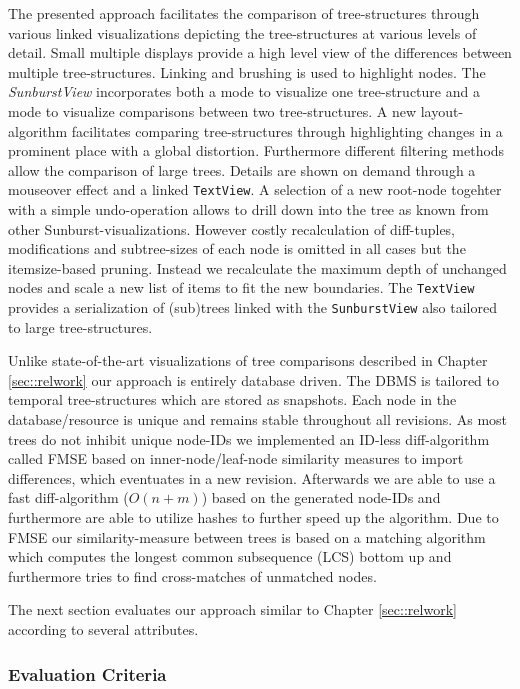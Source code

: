 The presented approach facilitates the comparison of tree-structures through various linked visualizations depicting the tree-structures at various levels of detail. Small multiple displays provide a high level view of the differences between multiple tree-structures. Linking and brushing is used to highlight nodes. The \emph{SunburstView} incorporates both a mode to visualize one tree-structure and a mode to visualize comparisons between two tree-structures. A new layout-algorithm facilitates comparing tree-structures through highlighting changes in a prominent place with a global distortion. Furthermore different filtering methods allow the comparison of large trees. Details are shown on demand through a mouseover effect and a linked \texttt{TextView}. A selection of a new root-node togehter with a simple undo-operation allows to drill down into the tree as known from other Sunburst-visualizations. However costly recalculation of diff-tuples, modifications and subtree-sizes of each node is omitted in all cases but the itemsize-based pruning. Instead we recalculate the maximum depth of unchanged nodes and scale a new list of items to fit the new boundaries. The \texttt{TextView} provides a serialization of (sub)trees linked with the \texttt{SunburstView} also tailored to large tree-structures.

Unlike state-of-the-art visualizations of tree comparisons described in Chapter \ref{sec::relwork} our approach is entirely database driven. The DBMS is tailored to temporal tree-structures which are stored as snapshots. Each node in the database/resource is unique and remains stable throughout all revisions. As most trees do not inhibit unique node-IDs we implemented an ID-less diff-algorithm called FMSE based on inner-node/leaf-node similarity measures to import differences, which eventuates in a new revision. Afterwards we are able to use a fast diff-algorithm ($O(n+m)$) based on the generated node-IDs and furthermore are able to utilize hashes to further speed up the algorithm. Due to FMSE our similarity-measure between trees is based on a matching algorithm which computes the longest common subsequence (LCS) bottom up and furthermore tries to find cross-matches of unmatched nodes.

The next section evaluates our approach similar to Chapter \ref{sec::relwork} according to several attributes.

\subsubsection{Evaluation Criteria}

